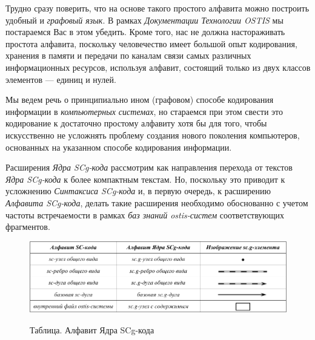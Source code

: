 \bigskip
Трудно сразу поверить, что на основе такого простого алфавита можно построить удобный и  \textit{графовый язык}. В рамках \textit{Документации Технологии OSTIS} мы постараемся Вас в этом убедить. Кроме того, нас не должна настораживать простота алфавита, поскольку человечество имеет большой опыт кодирования, хранения в памяти и передачи по каналам связи самых различных информационных ресурсов, используя алфавит, состоящий только из двух классов элементов --- единиц и нулей. 

Мы ведем речь о принципиально ином (графовом) способе кодирования информации в \textit{компьютерных системах}, но стараемся при этом свести это кодирование к достаточно простому алфавиту хотя бы для того, чтобы искусственно не усложнять проблему создания нового поколения компьютеров, основанных на указанном способе кодирования информации. 

Расширения \textit{Ядра SCg-кода} рассмотрим как направления перехода от текстов \textit{Ядра SCg-кода} к более компактным текстам. Но, поскольку это приводит к усложнению \textit{Синтаксиса SCg-кода} и, в первую очередь, к расширению \textit{Алфавита SCg-кода\scnsupergroupsign}, делать такие расширения необходимо обоснованно с учетом частоты встречаемости в рамках \textit{баз знаний ostis-систем} соответствующих фрагментов.

\begin{figure}[H]
	\centering
	\caption{Таблица. Алфавит Ядра SCg-кода\scnsupergroupsign}
	\includegraphics[scale=0.8]{images/intro/scg/SCg-core-alphabet.pdf}
	\label{fig:scg_core-alphabet}
\end{figure}

